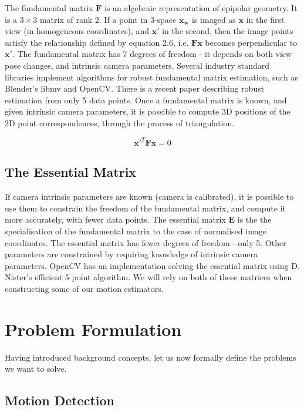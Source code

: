 \documentclass[11pt,english]{report}
\begin{document}
The fundamental matrix $\mathbf{F}$ is an algebraic representation of epipolar geometry. It is a $3 \times 3$ matrix of rank 2. If a point in 3-space $\mathbf{x_w}$ is imaged as $\mathbf{x}$ in the first view (in homogeneous coordinates), and $\mathbf{x'}$ in the second, then the image points satisfy the relationship defined by equation 2.6\cite{hartley_zisserman_2004}, i.e. $\mathbf{Fx}$ becomes perpendicular to $\mathbf{x'}$. The fundamental matrix has 7 degrees of freedom - it depends on both view pose changes, and intrinsic camera parameters. Several industry standard libraries implement algorithms for robust fundamental matrix estimation, such as Blender's libmv and OpenCV. There is a recent paper describing robust estimation from only 5 data points\cite{8578130}. Once a fundamental matrix is known, and given intrinsic camera parameters, it is possible to compute 3D positions of the 2D point correspondences, through the process of triangulation.

\begin{equation}
	\mathbf{x'}^T \mathbf{F} \mathbf{x} = 0
\end{equation}

\subsection{The Essential Matrix}

If camera intrinsic parameters are known (camera is calibrated), it is possible to use them to constrain the freedom of the fundamental matrix, and compute it more accurately, with fewer data points. The essential matrix $\mathbf{E}$ is the the specialisation of the fundamental matrix to the case of normalised image coordinates\cite{hartley_zisserman_2004}. The essential matrix has fewer degrees of freedom - only 5. Other parameters are constrained by requiring knowledge of intrinsic camera parameters. OpenCV has an implementation solving the essential matrix using D. Nister's efficient 5 point algorithm\cite{1211470}. We will rely on both of these matrices when constructing some of our motion estimators.

\section{Problem Formulation}

Having introduced background concepts, let us now formally define the problems we want to solve.

\subsection{Motion Detection}
\end{document}
